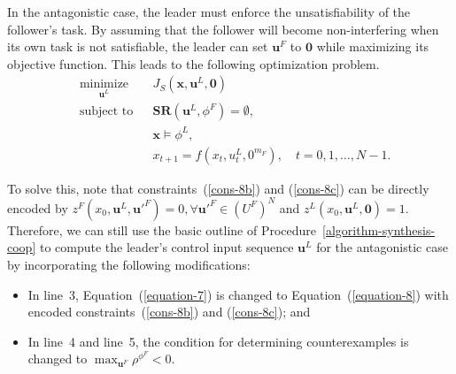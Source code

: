 \documentclass[letterpaper, 10 pt, conference]{ieeeconf}
\begin{document}
In the antagonistic case, the leader must enforce the unsatisfiability of the follower's task. By assuming that the follower will become non-interfering when its own task is not satisfiable, the leader can set $\mathbf{u}^F$ to $\mathbf{0}$ while maximizing its objective function. This leads to the following optimization problem.
\begin{subequations}\label{equation-8}
\begin{align}
& \underset{\mathbf{u}^L}{\text{minimize}} & &  J_S(\mathbf{x}, \mathbf{u}^L, \mathbf{0}) \\
& \text{subject to} & & \mathbf{SR}(\mathbf{u}^L, \phi^F) = \emptyset, \label{cons-8b} \\
& & & \mathbf{x} \models \phi^L, \label{cons-8c} \\
& & & x_{t+1} = f(x_t, u^L_t, 0^{m_F}), \quad t = 0, 1, \dots, N-1.\nonumber
\end{align}   
\end{subequations}

To solve this, note that constraints~(\ref{cons-8b}) and (\ref{cons-8c}) can be directly encoded by $z^F(x_0,\mathbf{u}^L,\mathbf{u}'^F)=0,  \forall  \mathbf{u}'^F \in (U^F)^N$ and $z^L(x_0,\mathbf{u}^L,\mathbf{0})=1$.
Therefore, we can still use the basic outline of Procedure~\ref{algorithm-synthesis-coop} to compute the leader's control input sequence $\mathbf{u}^L$ for the antagonistic case by incorporating the following modifications:
\begin{itemize}
    \item 
    In line~3,  Equation~(\ref{equation-7}) is changed to  Equation~(\ref{equation-8}) with encoded constraints~(\ref{cons-8b}) and (\ref{cons-8c}); and
    \item 
    In line~4 and line~5, the condition for determining counterexamples is changed to $\max_{\mathbf{u}^F}\rho^{\phi^F}< 0$.
\end{itemize}
\end{document}
